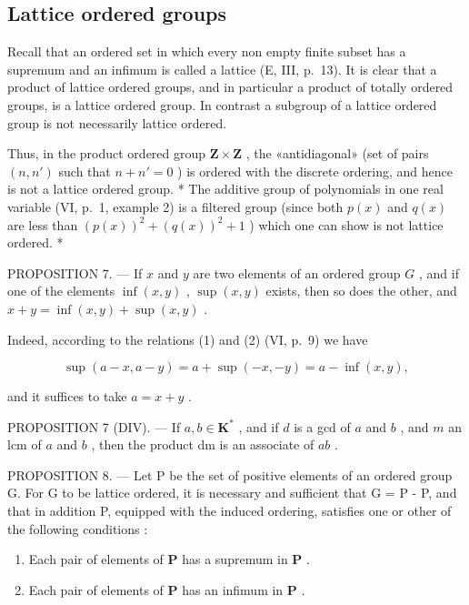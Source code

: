 \subsection{Lattice ordered groups}

Recall that an ordered set in which every non empty finite subset has a supremum and an infimum is called a lattice (E, III, p.~13). It is clear that a product of lattice ordered groups, and in particular a product of totally ordered groups, is a lattice ordered group. In contrast a subgroup of a lattice ordered group is not necessarily lattice ordered.

Thus, in the product ordered group \(\mathbf{Z} \times \mathbf{Z}\) , the «antidiagonal» (set of pairs \((n, n')\) such that \(n + n' = 0\) ) is ordered with the discrete ordering, and hence is not a lattice ordered group. * The additive group of polynomials in one real variable (VI, p.~1, example 2) is a filtered group (since both \(p(x)\) and \(q(x)\) are less than \((p(x))^2 + (q(x))^2 + 1\) ) which one can show is not lattice ordered. *

PROPOSITION 7. --- If \(x\) and \(y\) are two elements of an ordered group \(G\) , and if one of the elements \(\inf(x, y)\) , \(\sup(x, y)\) exists, then so does the other, and \(x + y = \inf(x, y) + \sup(x, y)\) .

Indeed, according to the relations (1) and (2) (VI, p.~9) we have

\[
\sup (a - x, a - y) = a + \sup (- x, - y) = a - \inf (x, y),
\]

and it suffices to take \(a = x + y\) .

PROPOSITION 7 (DIV). --- If \(a, b \in \mathbf{K}^{*}\) , and if \(d\) is a gcd of \(a\) and \(b\) , and \(m\) an lcm of \(a\) and \(b\) , then the product dm is an associate of \(ab\) .

PROPOSITION 8. --- Let P be the set of positive elements of an ordered group G. For G to be lattice ordered, it is necessary and sufficient that G = P - P, and that in addition P, equipped with the induced ordering, satisfies one or other of the following conditions :

\begin{enumerate}
\def\labelenumi{\alph{enumi})}
\item
  Each pair of elements of \(\mathbf{P}\) has a supremum in \(\mathbf{P}\) .
\item
  Each pair of elements of \(\mathbf{P}\) has an infimum in \(\mathbf{P}\) .
\end{enumerate}

